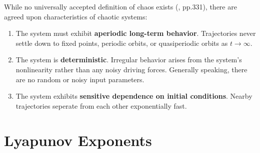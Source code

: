         While no universally accepted definition of chaos exists (\cite{item:2}, pp.331), there are agreed upon characteristics
        of chaotic systems:
        \begin{enumerate}
            \item The system must exhibit \textbf{aperiodic long-term behavior}. Trajectories never settle down to
                    fixed points, periodic orbits, or quasiperiodic orbits as $t\to\infty$.
            \item The system is \textbf{deterministic}. Irregular behavior arises from the system's nonlinearity rather
                    than any noisy driving forces. Generally speaking, there are no random or noisy input parameters.
            \item The system exhibits \textbf{sensitive dependence on initial conditions}. Nearby trajectories seperate
                    from each other exponentially fast.\\
        \end{enumerate}


  \section{Lyapunov Exponents}\label{sec:lyapunov}

